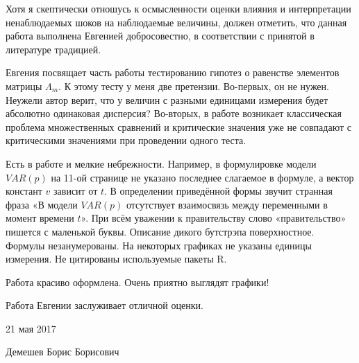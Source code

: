 \documentclass[a4paper, 12pt]{article}
\begin{document}
Хотя я скептически отношусь к осмысленности оценки влияния и
интерпретации ненаблюдаемых шоков на наблюдаемые величины, должен
отметить, что данная работа выполнена Евгенией добросовестно, в
соответствии с принятой в литературе традицией.

Евгения посвящает часть работы тестированию гипотез о равенстве
элементов матрицы \(\Lambda_m\). К этому тесту у меня две претензии.
Во-первых, он не нужен. Неужели автор верит, что у величин с разными
единицами измерения будет абсолютно одинаковая дисперсия? Во-вторых, в
работе возникает классическая проблема множественных сравнений и
критические значения уже не совпадают с критическими значениями при
проведении одного теста.

Есть в работе и мелкие небрежности. Например, в формулировке модели
\(VAR(p)\) на 11-ой странице не указано последнее слагаемое в формуле, а
вектор констант \(v\) зависит от \(t\). В определении приведённой формы
звучит странная фраза «В модели \(VAR(p)\) отсутствует взаимосвязь между
переменными в момент времени \(t\)». При всём уважении к правительству
слово «правительство» пишется с маленькой буквы. Описание дикого
бутстрэпа поверхностное. Формулы незанумерованы. На некоторых графиках
не указаны единицы измерения. Не цитированы используемые пакеты R.

Работа красиво оформлена. Очень приятно выглядят графики!

Работа Евгении заслуживает отличной оценки.

\vspace{1cm}

21 мая 2017

Демешев Борис Борисович
\end{document}
